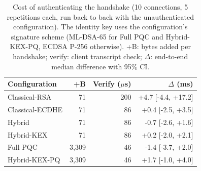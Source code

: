 \begin{table}[t]
\centering
\caption{Cost of authenticating the handshake (10 connections, 5 repetitions each, run back to back with the unauthenticated configuration). The identity key uses the configuration's signature scheme (ML-DSA-65 for Full PQC and Hybrid-KEX-PQ, ECDSA P-256 otherwise). +B: bytes added per handshake; verify: client transcript check; $\Delta$: end-to-end median difference with 95\% CI.}
\label{tab:authcost}
\setlength{\tabcolsep}{3pt}
\footnotesize
\begin{tabular}{@{}lrrr@{}}
\toprule
Configuration & +B & Verify ($\mu$s) & $\Delta$ (ms) \\
\midrule
Classical-RSA & 71 & 200 & +4.7 [-4.4, +17.2] \\
Classical-ECDHE & 71 & 86 & +0.4 [-2.5, +3.5] \\
Hybrid & 71 & 86 & -0.7 [-2.6, +1.6] \\
Hybrid-KEX & 71 & 86 & +0.2 [-2.0, +2.1] \\
Full PQC & 3,309 & 46 & -1.4 [-3.7, +2.0] \\
Hybrid-KEX-PQ & 3,309 & 46 & +1.7 [-1.0, +4.0] \\
\bottomrule
\end{tabular}
\end{table}
